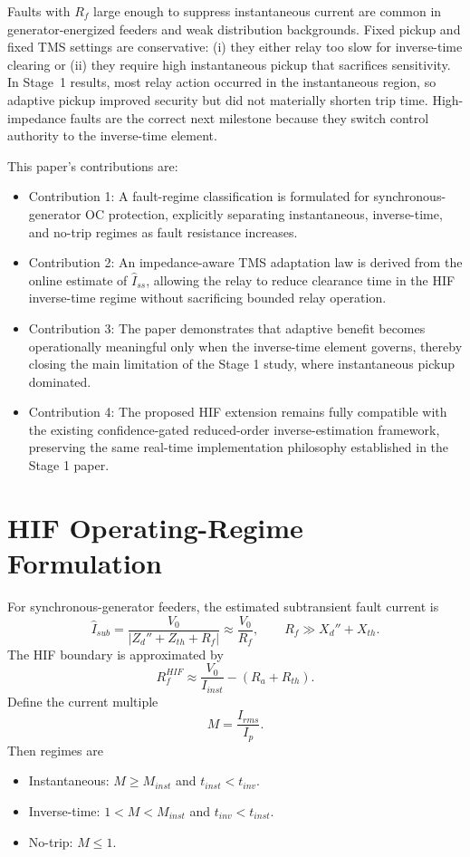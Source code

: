 \documentclass[10pt,journal,compsoc]{IEEEtran}
\begin{document}
Faults with $R_f$ large enough to suppress instantaneous current are common in generator-energized feeders and weak distribution backgrounds. Fixed pickup and fixed TMS settings are conservative: (i) they either relay too slow for inverse-time clearing or (ii) they require high instantaneous pickup that sacrifices sensitivity. In Stage~1 results, most relay action occurred in the instantaneous region, so adaptive pickup improved security but did not materially shorten trip time. High-impedance faults are the correct next milestone because they switch control authority to the inverse-time element.

This paper's contributions are:
\begin{itemize}
  \item Contribution 1: A fault-regime classification is formulated for synchronous-generator OC protection, explicitly separating instantaneous, inverse-time, and no-trip regimes as fault resistance increases.
  \item Contribution 2: An impedance-aware TMS adaptation law is derived from the online estimate of $\hat{I}_{ss}$, allowing the relay to reduce clearance time in the HIF inverse-time regime without sacrificing bounded relay operation.
  \item Contribution 3: The paper demonstrates that adaptive benefit becomes operationally meaningful only when the inverse-time element governs, thereby closing the main limitation of the Stage 1 study, where instantaneous pickup dominated.
  \item Contribution 4: The proposed HIF extension remains fully compatible with the existing confidence-gated reduced-order inverse-estimation framework, preserving the same real-time implementation philosophy established in the Stage 1 paper.
\end{itemize}

\section{HIF Operating-Regime Formulation}
For synchronous-generator feeders, the estimated subtransient fault current is
\begin{equation}
\hat I_{sub} = \frac{V_0}{|Z_d'' + Z_{th} + R_f|} \approx \frac{V_0}{R_f},\qquad R_f\gg X_d'' + X_{th}.
\end{equation}
The HIF boundary is approximated by
\begin{equation}
R_f^{HIF} \approx \frac{V_0}{I_{inst}} - (R_a + R_{th}).
\end{equation}
Define the current multiple
\begin{equation}
M = \frac{I_{rms}}{I_p}.
\end{equation}
Then regimes are
\begin{itemize}
  \item Instantaneous: $M\ge M_{inst}$ and $t_{inst}<t_{inv}$.
  \item Inverse-time: $1<M<M_{inst}$ and $t_{inv}<t_{inst}$.
  \item No-trip: $M\le1$.
\end{itemize}
\end{document}
